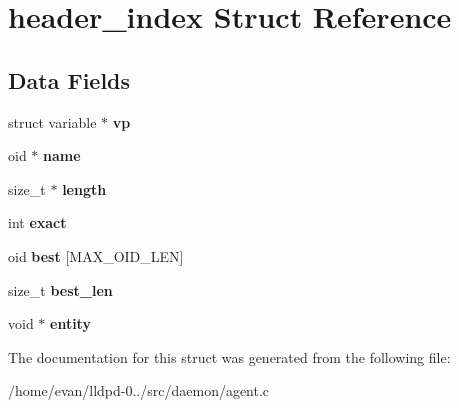 \section{header\-\_\-index \-Struct \-Reference}
\label{structheader__index}
\subsection*{\-Data \-Fields}
\begin{DoxyCompactItemize}
\item 
struct variable $\ast$ {\bfseries vp}\label{structheader__index_a7c2feded0186dc13dbb861a4757c39be}

\item 
oid $\ast$ {\bfseries name}\label{structheader__index_a7a8df56fcc0d76719c17f8100fbd1ca5}

\item 
size\-\_\-t $\ast$ {\bfseries length}\label{structheader__index_aa86cee297c70b6cd21d4caff5a300725}

\item 
int {\bfseries exact}\label{structheader__index_a64a23a1ed1e53d37a3c300e4420f918c}

\item 
oid {\bfseries best} [\-M\-A\-X\-\_\-\-O\-I\-D\-\_\-\-L\-E\-N]\label{structheader__index_aca610e68826ea0d123d613d295beaa9e}

\item 
size\-\_\-t {\bfseries best\-\_\-len}\label{structheader__index_a643715b6c525f4a40c2696b94c2cbc3f}

\item 
void $\ast$ {\bfseries entity}\label{structheader__index_a96f221cdf8c54f1f57b418d5985f359a}

\end{DoxyCompactItemize}


\-The documentation for this struct was generated from the following file\-:\begin{DoxyCompactItemize}
\item 
/home/evan/lldpd-\/0../src/daemon/agent.\-c\end{DoxyCompactItemize}
